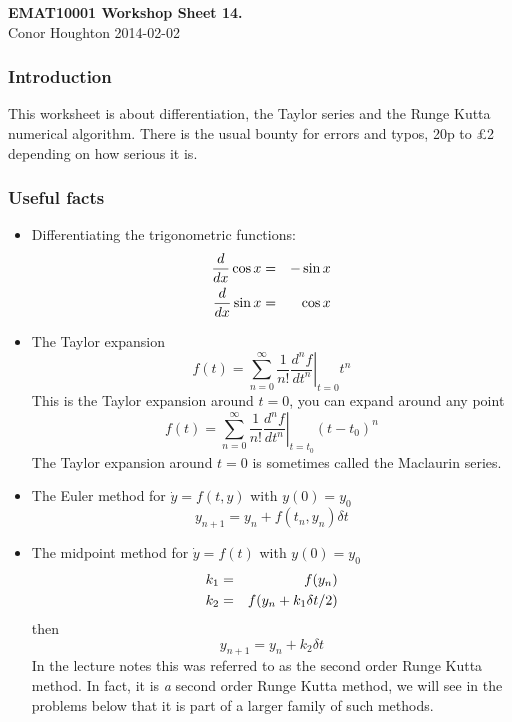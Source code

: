 \documentclass[12pt]{article}
\begin{document}
\begin{center}
{\bf EMAT10001 Workshop Sheet 14.}\\[1cm]{} Conor Houghton 2014-02-02
\end{center}
\subsubsection*{Introduction} 
This worksheet is about differentiation, the Taylor series and the Runge Kutta numerical algorithm. There is the usual bounty for errors and typos, 20p to \pounds 2
depending on how serious it is.

\subsubsection*{Useful facts}
\begin{itemize}
\item Differentiating the trigonometric functions:
\begin{eqnarray}
\frac{d}{dx}\cos{x}&=&-\sin{x}\cr
\frac{d}{dx}\sin{x}&=&\cos{x}
\end{eqnarray}
\item The Taylor expansion
\begin{equation}
f(t)=\sum_{n=0}^\infty\frac{1}{n!}\left.\frac{d^nf}{dt^n}\right|_{t=0}t^n
\end{equation}
This is the Taylor expansion around $t=0$, you can expand around any point
\begin{equation}
f(t)=\sum_{n=0}^\infty\frac{1}{n!}\left.\frac{d^nf}{dt^n}\right|_{t=t_0}(t-t_0)^n
\end{equation}
The Taylor expansion around $t=0$ is sometimes called the Maclaurin series. 
\item The Euler method for $\dot{y}=f(t,y)$ with $y(0)=y_0$
\begin{equation}
y_{n+1}=y_n+f(t_n,y_n)\delta t
\end{equation}
\item The midpoint method for $\dot{y}=f(t)$ with $y(0)=y_0$
\begin{eqnarray}
k_1&=&f(y_n)\cr
k_2&=&f(y_n+k_1\delta t/2)
\end{eqnarray}
then
\begin{equation}
y_{n+1}=y_n+k_2\delta t
\end{equation}
In the lecture notes this was referred to as the second order Runge
Kutta method. In fact, it is \textsl{a} second order Runge Kutta
method, we will see in the problems below that it is part of a larger family of such methods.

\end{itemize}
\end{document}
